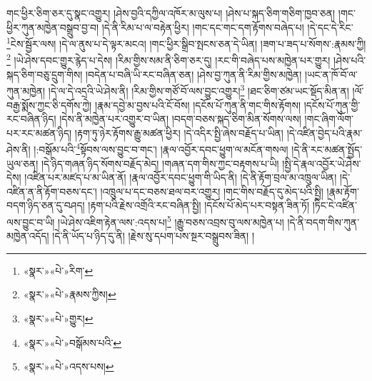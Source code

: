 གང་ཕྱིར་ཅིག་ཅར་དུ་སྣང་འགྱུར། །ཤེས་བྱའི་དཀྱིལ་འཁོར་མ་ལུས་པ། །ཤེས་པ་སྐད་ཅིག་གཅིག་ཁྱབ་ཅན། །གང་ཕྱིར་ཀུན་མཁྱེན་བསྒྲུབ་བྱ་བ། །དེ་ནི་རིམ་པ་ལ་བརྟེན་ཕྱིར། །གང་དང་གང་དག་རྟོགས་བཞེད་པ། །དེ་དང་དེ་རིང་\footnote{«སྣར་»«པེ་»རིག་}ངེས་སྦྱོར་ལས། །དེ་ལ་ནུས་པ་དེ་ལྟར་མངའ། །གང་ཕྱིར་སྒྲིབ་སྤངས་ཅན་དེ་ཡིན། །ཟག་པ་ཟད་པ་སོགས་:རྣམས་ཀྱི།\footnote{«སྣར་»«པེ་»རྣམས་ཀྱིས།} །ཡེ་ཤེས་དབང་གྱུར་རྙེད་པ་དེས། །རིམ་གྱིས་སམ་ནི་ཅིག་ཅར་དུ། །རང་གི་བཞེད་པས་མཁྱེན་པར་གྱུར། །ཤེས་པའི་སྐད་ཅིག་བཅུ་དྲུག་གིས། །བདེན་པ་བཞི་ཡི་རང་བཞིན་ཅན། །ཤེས་བྱ་ཀུན་ནི་རིམ་གྱིས་མཁྱེན། །ཡང་ན་ཁོ་བོ་ལ་ཀུན་མཁྱེན། །དེ་ལ་དེ་འདྲའི་ཡེ་ཤེས་ནི། །རིམ་གྱིས་གཙོ་བོ་ལས་བྱུང་འགྱུར།\footnote{«སྣར་»«པེ་»གྱུར།} །ཐང་ཅིག་ཙམ་ཡང་སྡོད་མིན་ན། །ལོ་བརྒྱ་སྨོས་ཀྱང་ཅི་དགོས་ཀྱེ། །རྣམ་དབྱེ་མ་བྱས་པའི་ངོ་བོས། །དངོས་པོ་ཀུན་ནི་གང་གིས་རྟོགས། །དངོས་པོ་ཀུན་གྱི་རང་བཞིན་ཉིད། །དེས་ནི་མཁྱེན་པར་འགྱུར་བ་ཡིན། །བདག་བཅས་སྐད་ཅིག་མིན་སོགས་ལས། །གང་ཞིག་ལོག་པར་རང་མཚན་ཉིད། །རྟག་ཏུ་ཉེར་རྟོགས་རྒྱུ་མཚན་ཕྱིར། །དེ་འདིར་སྤྱི་ཞེས་བརྗོད་པ་ཡིན། །དེ་འཛིན་བྱེད་པའི་རྣམ་ཤེས་ནི། །:བསྒོམ་པའི་\footnote{«སྣར་»«པེ་»བསྒོམས་པའི་}སྟོབས་ལས་བྱུང་བ་གང་། །རྣལ་འབྱོར་དབང་ཕྱུག་ལ་མངོན་གསལ། །དེ་ནི་རང་མཚན་སྤྱོད་ཡུལ་ཅན། །དེ་ཉིད་གཞན་ཉིད་སོགས་བརྗོད་མེད། །གཞན་དག་གིས་ཀྱང་བརྟགས་པ་ཡི། །སྤྱི་དེ་རྣལ་འབྱོར་ཡེ་ཤེས་དེས། །འཛིན་པར་མཛད་པ་མ་ཡིན་ནོ། །རྣལ་འབྱོར་དབང་ཕྱུག་གི་ཡིད་ནི། །དེ་ནི་རྟོག་བྲལ་མ་འཁྲུལ་ཡིན། །དེ་འཛིན་ན་ནི་རྟོག་བཅས་དང་། །འཁྲུལ་པ་དང་བཅས་ཐལ་བར་འགྱུར། །གང་གིས་བརྗོད་དུ་མེད་པའི་སྤྱི། །རྣམ་རྟོག་བདག་ཉིད་ཅན་དུ་བཤད། །རྟག་པའི་རྗེས་འགྲོའི་རང་བཞིན་སྤྱི། །དངོས་པོ་མེད་པར་བསྟན་ཟིན་ཏོ། །ཏིང་ངེ་འཛིན་ལས་བྱུང་བ་ཡི། །ཡེ་ཤེས་འཇིག་རྟེན་ལས་:འདས་པ།\footnote{«སྣར་»«པེ་»འདས་པས།} །རྒྱུ་བཅས་འབྲས་བུ་ལས་མཁྱེན་པ། །དེ་ནི་བདག་གིས་ཀུན་མཁྱེན་འདོད། །དེ་ནི་ཡོད་པ་ཉིད་དུ་ནི། །རྗེས་སུ་དཔག་པས་སྔར་བསྒྲུབས་ཟིན། །
